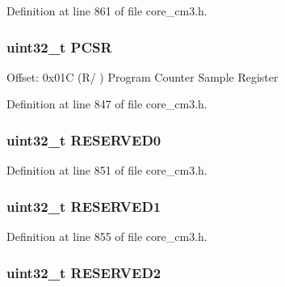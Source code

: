 Definition at line 861 of file core\+\_\+cm3.\+h.

\subsubsection[{\texorpdfstring{P\+C\+SR}{PCSR}}]{ uint32\+\_\+t P\+C\+SR}\hypertarget{struct_d_w_t___type_a72e52fffe9ac6af0ee15877e2d5dac41}{}\label{struct_d_w_t___type_a72e52fffe9ac6af0ee15877e2d5dac41}
Offset\+: 0x01C (R/ ) Program Counter Sample Register 

Definition at line 847 of file core\+\_\+cm3.\+h.

\subsubsection[{\texorpdfstring{R\+E\+S\+E\+R\+V\+E\+D0}{RESERVED0}}]{\setlength{\rightskip}{0pt plus 5cm}uint32\+\_\+t R\+E\+S\+E\+R\+V\+E\+D0}\hypertarget{struct_d_w_t___type_affae06cd6df5e9fe9a92994052fd3bec}{}\label{struct_d_w_t___type_affae06cd6df5e9fe9a92994052fd3bec}


Definition at line 851 of file core\+\_\+cm3.\+h.

\subsubsection[{\texorpdfstring{R\+E\+S\+E\+R\+V\+E\+D1}{RESERVED1}}]{\setlength{\rightskip}{0pt plus 5cm}uint32\+\_\+t R\+E\+S\+E\+R\+V\+E\+D1}\hypertarget{struct_d_w_t___type_aaa45b15c650670f4f84000a1f419ca00}{}\label{struct_d_w_t___type_aaa45b15c650670f4f84000a1f419ca00}


Definition at line 855 of file core\+\_\+cm3.\+h.

\subsubsection[{\texorpdfstring{R\+E\+S\+E\+R\+V\+E\+D2}{RESERVED2}}]{\setlength{\rightskip}{0pt plus 5cm}uint32\+\_\+t R\+E\+S\+E\+R\+V\+E\+D2}\hypertarget{struct_d_w_t___type_a093dc351b7db0476c625f462acb9fd7f}{}\label{struct_d_w_t___type_a093dc351b7db0476c625f462acb9fd7f}



